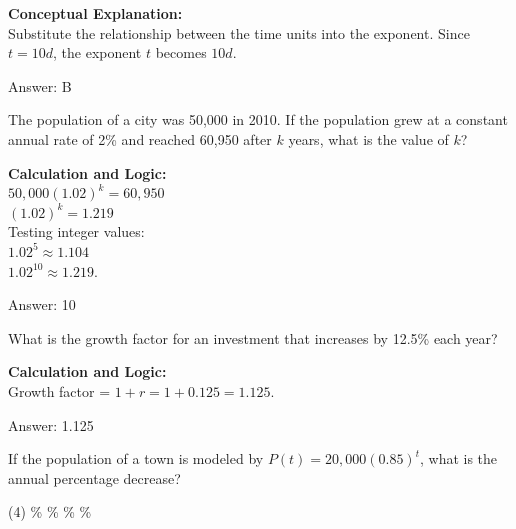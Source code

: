 \documentclass[11pt,paper=a4,answers]{exam}
\begin{document}
\begin{questions}
\begin{solution}
\textbf{Conceptual Explanation:} \\
Substitute the relationship between the time units into the exponent. Since $t = 10d$, the exponent $t$ becomes $10d$.

\vspace{25pt}

Answer: \colorbox{yellow!100}{B}
\end{solution}

\vspace{40pt}

\question
The population of a city was 50,000 in 2010. If the population grew at a constant annual rate of 2\% and reached 60,950 after $k$ years, what is the value of $k$?

\begin{solution}
\textbf{Calculation and Logic:} \\
$50,000(1.02)^k = 60,950$ \\
$(1.02)^k = 1.219$ \\
Testing integer values: \\
$1.02^5 \approx 1.104$ \\
$1.02^{10} \approx 1.219$.

\vspace{25pt}

Answer: \colorbox{yellow!100}{10}
\end{solution}

\vspace{40pt}

\question
What is the growth factor for an investment that increases by 12.5\% each year?

\begin{solution}
\textbf{Calculation and Logic:} \\
Growth factor = $1 + r = 1 + 0.125 = 1.125$.

\vspace{25pt}

Answer: \colorbox{yellow!100}{1.125}
\end{solution}

\vspace{40pt}

\question
If the population of a town is modeled by $P(t) = 20,000(0.85)^t$, what is the annual percentage decrease?
\begin{tasks}(4)
    \%
    \%
    \%
    \%
\end{tasks}


\end{questions}
\end{document}

